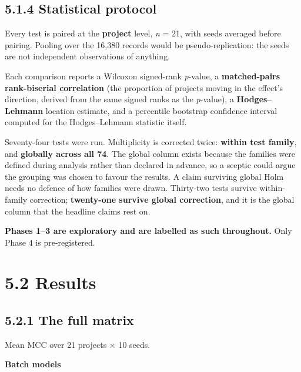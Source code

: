 \subsection{5.1.4 Statistical protocol}\label{statistical-protocol}

Every test is paired at the \textbf{project} level, \emph{n} = 21, with
seeds averaged before pairing. Pooling over the 16,380 records would be
pseudo-replication: the seeds are not independent observations of
anything.

Each comparison reports a Wilcoxon signed-rank \emph{p}-value, a
\textbf{matched-pairs rank-biserial correlation} (the proportion of
projects moving in the effect's direction, derived from the same signed
ranks as the \emph{p}-value), a \textbf{Hodges--Lehmann} location
estimate, and a percentile bootstrap confidence interval computed for
the Hodges--Lehmann statistic itself.

Seventy-four tests were run. Multiplicity is corrected twice:
\textbf{within test family}, and \textbf{globally across all 74}. The
global column exists because the families were defined during analysis
rather than declared in advance, so a sceptic could argue the grouping
was chosen to favour the results. A claim surviving global Holm needs no
defence of how families were drawn. Thirty-two tests survive
within-family correction; \textbf{twenty-one survive global correction},
and it is the global column that the headline claims rest on.

\textbf{Phases 1--3 are exploratory and are labelled as such
throughout.} Only Phase 4 is pre-registered.

\section{5.2 Results}\label{results}

\subsection{5.2.1 The full matrix}\label{the-full-matrix}

Mean MCC over 21 projects \ensuremath{\times} 10 seeds.

\textbf{Batch models}

